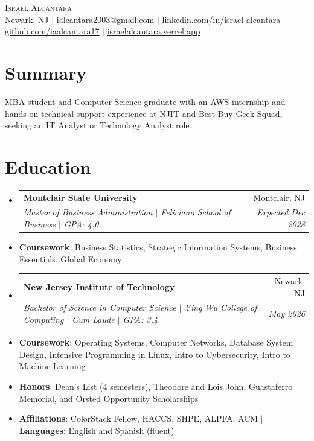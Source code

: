 \documentclass[letterpaper,11pt]{article}
\makeatletter
\newcommand{\resumeFirstLine}[1]{\vspace{3pt}\item[]\small{#1}}
\newcommand{\resumeLine}[1]{\vspace{-1pt}\item[]\small{#1}}
\newcommand{\resumeSchoolGap}{\vspace{3pt}}
\newcommand{\resumeSubheading}[4]{
  \vspace{-2pt}\item
    \begin{tabular*}{0.97\textwidth}[t]{l@{\extracolsep{\fill}}r}
      \textbf{#1} & #2 \\
      \textit{\small#3} & \textit{\small #4} \\
    \end{tabular*}\vspace{-7pt}
}
\newcommand{\resumeSubHeadingListStart}{\begin{itemize}[leftmargin=0.15in, label={}, itemsep=1pt, parsep=0pt, topsep=2pt]}
\newcommand{\resumeSubHeadingListEnd}{\end{itemize}}
\makeatother
\begin{document}
\begin{center}
    {\Huge \scshape Israel Alcantara} \\ \vspace{1pt}
    \small Newark, NJ $|$ \href{mailto:ialcantara2003@gmail.com}{\underline{ialcantara2003@gmail.com}} $|$
    \href{https://www.linkedin.com/in/israel-alcantara}{\underline{linkedin.com/in/israel-alcantara}} \\
    \href{https://github.com/iaalcantara17}{\underline{github.com/iaalcantara17}} $|$
    \href{https://israelalcantara.vercel.app}{\underline{israelalcantara.vercel.app}}
\end{center}
\vspace{-8pt}
\section{Summary}
\begin{itemize}[leftmargin=0.15in, label={}]
    \small{\item{MBA student and Computer Science graduate with an AWS internship and hands-on technical support experience at NJIT and Best Buy Geek Squad, seeking an IT Analyst or Technology Analyst role.}}
\end{itemize}

\section{Education}
  \resumeSubHeadingListStart
    \resumeSubheading
      {Montclair State University}{Montclair, NJ}
      {Master of Business Administration $|$ Feliciano School of Business $|$ GPA: 4.0}{Expected Dec 2028}
      \resumeFirstLine{\textbf{Coursework}: Business Statistics, Strategic Information Systems, Business Essentials, Global Economy}
    \resumeSchoolGap
    \resumeSubheading
      {New Jersey Institute of Technology}{Newark, NJ}
      {Bachelor of Science in Computer Science $|$ Ying Wu College of Computing $|$ Cum Laude $|$ GPA: 3.4}{May 2026}
      \resumeFirstLine{\textbf{Coursework}: Operating Systems, Computer Networks, Database System Design, Intensive Programming in Linux, Intro to Cybersecurity, Intro to Machine Learning}
      \resumeLine{\textbf{Honors}: Dean's List (4 semesters), Theodore and Lois John, Guastaferro Memorial, and Orsted Opportunity Scholarships}
      \resumeLine{\textbf{Affiliations}: ColorStack Fellow, HACCS, SHPE, ALPFA, ACM $|$ \textbf{Languages}: English and Spanish (fluent)}
  \resumeSubHeadingListEnd
\end{document}
